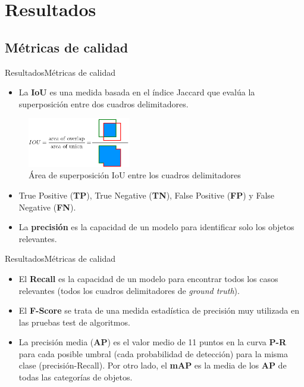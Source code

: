 \section{Resultados}

\subsection{Métricas de calidad}

\begin{frame}{Resultados}{Métricas de calidad}

\begin{itemize}
    \justifying
    \item La \textbf{IoU} es una medida basada en el índice Jaccard que evalúa la superposición entre dos cuadros delimitadores.
\end{itemize}

    \begin{figure}[ht]
    \centering
    \includegraphics[width=0.4\textwidth]{Images/resultados/metricas/iou.png}
    \caption{\label{fig:iou}Área de superposición IoU entre los cuadros delimitadores}
    \end{figure}
    
\begin{itemize}
    \justifying
    \item True Positive (\textbf{TP}), True Negative (\textbf{TN}), False Positive (\textbf{FP}) y False Negative (\textbf{FN}).
    \item La \textbf{precisión} es la capacidad de un modelo para identificar solo los objetos relevantes.
\end{itemize}

\end{frame}


\begin{frame}{Resultados}{Métricas de calidad}

\begin{itemize}
    \justifying
    \setlength\itemsep{1em}
    \item El \textbf{Recall} es la capacidad de un modelo para encontrar todos los casos relevantes (todos los cuadros delimitadores de \textit{ground truth}).
    \item El \textbf{F-Score} se trata de una medida estadística de precisión muy utilizada en las pruebas test de algoritmos.
    \item La precisión media (\textbf{AP}) es el valor medio de 11 puntos en la curva \textbf{P-R} para cada posible umbral (cada probabilidad de detección) para la misma clase (precisión-Recall). Por otro lado, el \textbf{mAP} es la media de los \textbf{AP} de todas las categorías de objetos.
\end{itemize}

\end{frame}


